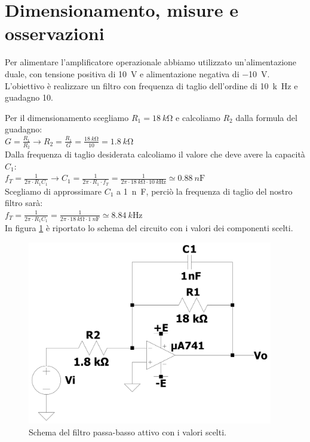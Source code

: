 \documentclass{report}
\begin{document}
\section{Dimensionamento, misure e osservazioni}
Per alimentare l'amplificatore operazionale abbiamo utilizzato un'alimentazione duale, con tensione positiva di \SI{10}{\volt} e alimentazione negativa di \SI{-10}{\volt}. L'obiettivo è realizzare un filtro con frequenza di taglio dell'ordine di \SI{10}{k\hertz} e guadagno 10. \par
\noindent Per il dimensionamento scegliamo $R_1=\SI{18}{k\ohm}$ e calcoliamo $R_2$ dalla formula del guadagno:
\\[2pt]\indent$\displaystyle{G=\frac{R_1}{R_2}\rightarrow R_2=\frac{R_1}{G} = \frac{\SI{18}{k\ohm}}{10}=\SI{1.8}{k\ohm}}$ 
\\[2pt]Dalla frequenza di taglio desiderata calcoliamo il valore che deve avere la capacità $C_1$:
\\[2pt]\indent$\displaystyle{f_T=\frac{1}{2\pi\cdot R_1C_1}\rightarrow C_1=\frac{1}{2\pi\cdot R_1\cdot f_T}=\frac{1}{2\pi\cdot \SI{18}{k\ohm}\cdot \SI{10}{k\hertz}}\simeq\SI{0.88}{n\farad}}$
\\[4pt]Scegliamo di approssimare $C_1$ a \SI{1}{n\farad}, perciò la frequenza di taglio del nostro filtro sarà:
\\[2pt]\indent$\displaystyle{f_T=\frac{1}{2\pi\cdot R_1C_1}=\frac{1}{2\pi\cdot \SI{18}{k\ohm}\cdot \SI{1}{n\farad}}\simeq\SI{8.84}{k\hertz}}$ %
\\[4pt]In figura \ref{figura:cto_filtro} è riportato lo schema del circuito con i valori dei componenti scelti. 
\begin{figure}[h!]
\centering
\includegraphics[height=8cm]{immagini/cto_filtro}
\caption{Schema del filtro passa-basso attivo con i valori scelti.}
\label{figura:cto_filtro}
\end{figure}
\end{document}
